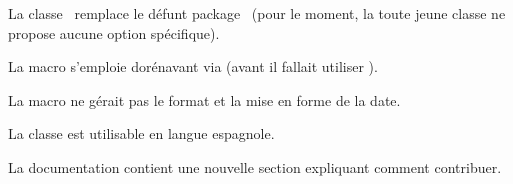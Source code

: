 \begin{tdocbreak}
	\item La classe \thisproj\ remplace le défunt package \thisproj\ (pour le moment, la toute jeune classe ne propose aucune option spécifique).

	\item La macro  s'emploie dorénavant via  (avant il fallait utiliser ).
\end{tdocbreak}


\begin{tdocfix}
	\item La macro  ne gérait pas le format et la mise en forme de la date.
\end{tdocfix}


\begin{tdocnew}
	\item La classe est utilisable en langue espagnole.

	\item La documentation contient une nouvelle section expliquant comment contribuer.
\end{tdocnew}

